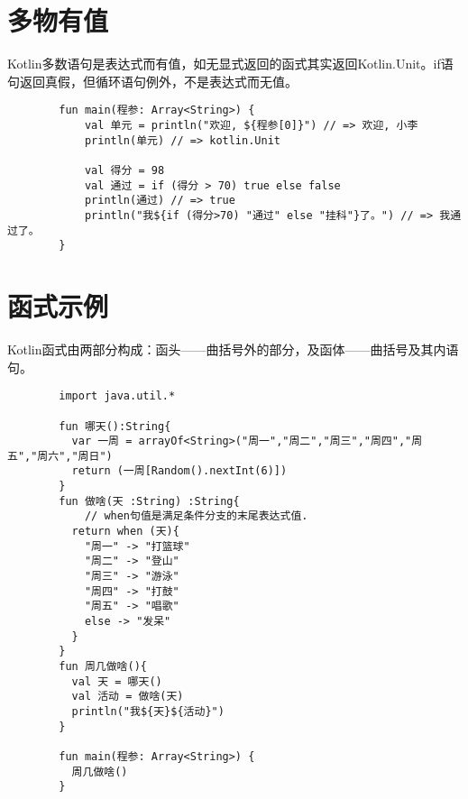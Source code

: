 \section{多物有值}
Kotlin多数语句是表达式而有值，如无显式返回的函式其实返回Kotlin.Unit。if语句返回真假，但循环语句例外，不是表达式而无值。
    \begin{verbatim}
        fun main(程参: Array<String>) {
            val 单元 = println("欢迎, ${程参[0]}") // => 欢迎, 小李
            println(单元) // => kotlin.Unit
          
            val 得分 = 98
            val 通过 = if (得分 > 70) true else false
            println(通过) // => true
            println("我${if (得分>70) "通过" else "挂科"}了。") // => 我通过了。
        }
    \end{verbatim}

\section{函式示例}
Kotlin函式由两部分构成：函头——曲括号外的部分，及函体——曲括号及其内语句。
    \begin{verbatim}
        import java.util.*

        fun 哪天():String{
          var 一周 = arrayOf<String>("周一","周二","周三","周四","周五","周六","周日")
          return (一周[Random().nextInt(6)])
        }
        fun 做啥(天 :String) :String{
            // when句值是满足条件分支的末尾表达式值.
          return when (天){
            "周一" -> "打篮球"
            "周二" -> "登山"
            "周三" -> "游泳"
            "周四" -> "打鼓"
            "周五" -> "唱歌"
            else -> "发呆"
          }
        }
        fun 周几做啥(){
          val 天 = 哪天()
          val 活动 = 做啥(天)
          println("我${天}${活动}")
        }
        
        fun main(程参: Array<String>) {
          周几做啥()
        }
    \end{verbatim}

